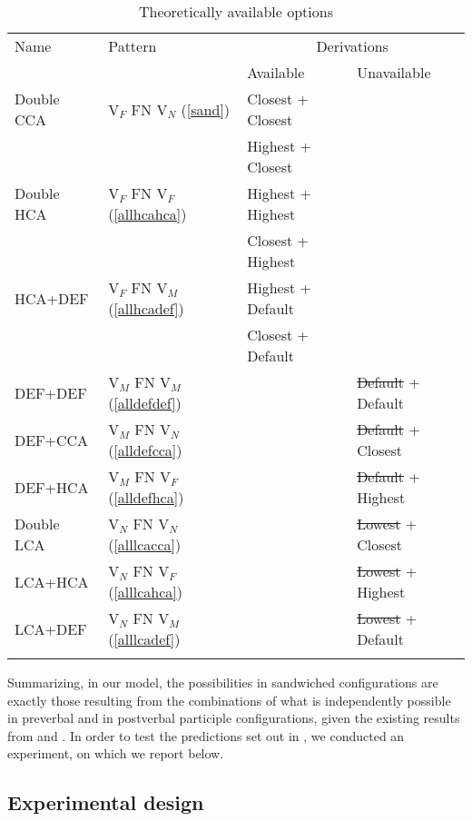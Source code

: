 \documentclass[output=paper
,modfonts
,nonflat]{langsci/langscibook}
\begin{document}
\begin{table}
\begin{tabularx}{\textwidth}{Xlll}
\lsptoprule
Name & Pattern & \multicolumn{2}{c}{Derivations}\\\cmidrule(lr){3-4} 
 &   & Available & Unavailable\\ 
\midrule
Double CCA & V$_F$ FN V$_N$ (\ref{sand})& Closest + Closest \\
& &  Highest + Closest &  \\
Double HCA & V$_F$ FN V$_F$ (\ref{allhcahca})& Highest + Highest \\ 
& &  Closest + Highest & \\
HCA+DEF & V$_F$ FN V$_M$ (\ref{allhcadef})&Highest + Default  \\
& & Closest + Default & \\ 
DEF+DEF & V$_M$ FN V$_M$  (\ref{alldefdef})& & \sout{Default} + Default \\ 
DEF+CCA & V$_M$ FN V$_N$  (\ref{alldefcca})& & \sout{Default} + Closest \\ 

DEF+HCA & V$_M$ FN V$_F$  (\ref{alldefhca})& & \sout{Default} + Highest \\ 
Double LCA & V$_N$ FN V$_N$  (\ref{alllcacca})& &\sout{Lowest} + Closest \\ 

LCA+HCA & V$_N$ FN V$_F$  (\ref{alllcahca})& & \sout{Lowest} + Highest \\ 
LCA+DEF & V$_N$ FN V$_M$  (\ref{alllcadef})& & \sout{Lowest} + Default \\ 
\lspbottomrule
\end{tabularx} 
\caption{Theoretically available options\label{tab:sandwichoptions}}
\end{table}

Summarizing, in our model, the possibilities in sandwiched configurations are exactly those resulting from the combinations of what is independently possible in preverbal and in postverbal participle configurations, given the existing results from \citet{marusicnevinsbadecker:15} and \citet{willergold:16}. In order to test the predictions set out in , we conducted an experiment, on which we report below.

\subsection{Experimental design} \label{sec:expdesign}
\end{document}
